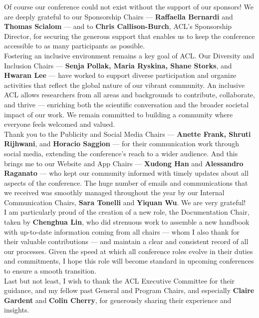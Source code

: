 Of course our conference could not exist without the support of our sponsors! We are deeply grateful to our Sponsorship Chairs --- \textbf{Raffaella Bernardi} and \textbf{Thomas Scialom} --- and to \textbf{Chris Callison-Burch}, ACL’s Sponsorship Director, for securing the generous support that enables us to keep the conference accessible to as many participants as possible.\\


Fostering an inclusive environment remains a key goal of ACL. Our Diversity and Inclusion Chairs --- \textbf{Senja Pollak, Maria Ryskina, Shane Storks}, and \textbf{Hwaran Lee} --- have worked to support diverse participation and organize activities that reflect the global nature of our vibrant community. An inclusive ACL allows researchers from all areas and backgrounds to contribute, collaborate, and thrive --- enriching both the scientific conversation and the broader societal impact of our work. We remain committed to building a community where everyone feels welcomed and valued.\\


Thank you to the Publicity and Social Media Chairs --- \textbf{Anette Frank, Shruti Rijhwani}, and \textbf{Horacio Saggion} --- for their communication work through social media, extending the conference’s reach to a wider audience. And this brings me to our Website and App Chairs --- \textbf{Xudong Han} and \textbf{Alessandro Raganato} --- who kept our community informed with timely updates about all aspects of the conference. The huge number of emails and communications that we received was smoothly managed throughout the year by our Internal Communication Chairs, \textbf{Sara Tonelli} and \textbf{Yiquan Wu}. We are very grateful!\\


I am particularly proud of the creation of a new role, the Documentation Chair, taken by \textbf{Chenghua Lin}, who did strenuous work to assemble a new handbook with up-to-date information coming from all chairs --- whom I also thank for their valuable contributions --- and maintain a clear and consistent record of all our processes. Given the speed at which all conference roles evolve in their duties and commitments, I hope this role will become standard in upcoming conferences to ensure a smooth transition.\\


Last but not least, I wish to thank the ACL Executive Committee for their guidance, and my fellow past General and Program Chairs, and especially \textbf{Claire Gardent} and \textbf{Colin Cherry}, for generously sharing their experience and insights.\\


